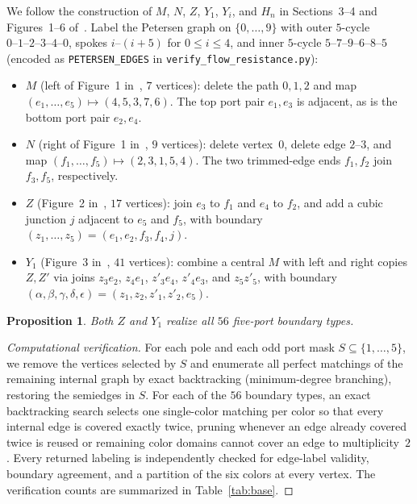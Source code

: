 \documentclass[11pt]{article}
\newtheorem{proposition}[theorem]{Proposition}
\begin{document}
We follow the construction of $M$, $N$, $Z$, $Y_1$, $Y_i$, and $H_n$ in Sections~3--4
and Figures~1--6 of~\cite{MNP}. Label the Petersen graph on $\{0,\dots,9\}$ with outer
$5$-cycle $0\text{--}1\text{--}2\text{--}3\text{--}4\text{--}0$, spokes $i\text{--}(i+5)$
for $0 \le i \le 4$, and inner $5$-cycle $5\text{--}7\text{--}9\text{--}6\text{--}8\text{--}5$
(encoded as \texttt{PETERSEN\_EDGES} in \texttt{verify\_flow\_resistance.py}):
\begin{itemize}
  \item $M$ (left of Figure~1 in~\cite{MNP}, $7$ vertices): delete the path $0,1,2$ and
        map $(e_1,\dots,e_5) \mapsto (4,5,3,7,6)$. The top port pair $e_1, e_3$ is
        adjacent, as is the bottom port pair $e_2, e_4$.
  \item $N$ (right of Figure~1 in~\cite{MNP}, $9$ vertices): delete vertex~$0$, delete
        edge $2\text{--}3$, and map $(f_1,\dots,f_5) \mapsto (2,3,1,5,4)$. The two
        trimmed-edge ends $f_1, f_2$ join $f_3, f_5$, respectively.
  \item $Z$ (Figure~2 in~\cite{MNP}, $17$ vertices): join $e_3$ to $f_1$ and $e_4$ to
        $f_2$, and add a cubic junction $j$ adjacent to $e_5$ and $f_5$, with boundary
        $(z_1,\dots,z_5) = (e_1, e_2, f_3, f_4, j)$.
  \item $Y_1$ (Figure~3 in~\cite{MNP}, $41$ vertices): combine a central $M$ with left
        and right copies $Z, Z'$ via joins $z_3 e_2$, $z_4 e_1$, $z'_3 e_4$, $z'_4 e_3$,
        and $z_5 z'_5$, with boundary
        $(\alpha,\beta,\gamma,\delta,\epsilon) = (z_1, z_2, z'_1, z'_2, e_5)$.
\end{itemize}

\begin{proposition}\label{prop:base}
Both $Z$ and $Y_1$ realize all $56$ five-port boundary types.
\end{proposition}

\begin{proof}[Computational verification]
For each pole and each odd port mask $S \subseteq \{1,\dots,5\}$, we remove the vertices
selected by $S$ and enumerate all perfect matchings of the remaining internal graph by
exact backtracking (minimum-degree branching), restoring the semiedges in $S$. For each
of the $56$ boundary types, an exact backtracking search selects one single-color
matching per color so that every internal edge is covered exactly twice, pruning whenever
an edge already covered twice is reused or remaining color domains cannot cover an edge
to multiplicity~$2$. Every returned labeling is independently checked for edge-label
validity, boundary agreement, and a partition of the six colors at every vertex. The
verification counts are summarized in Table~\ref{tab:base}.
\end{proof}
\end{document}
